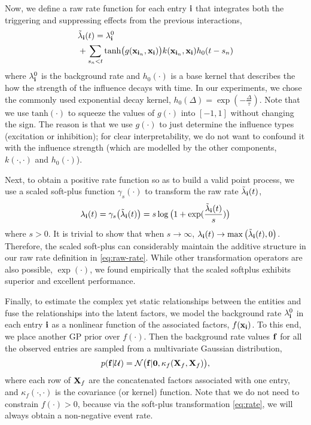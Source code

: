 Now, we define a raw rate function for each entry ${\bf i}$ that integrates both the triggering and suppressing effects from the previous interactions, 
\begin{align}
&{\tilde{\lambda}}_{{\bf i}}(t) = \lambda_{\bf i}^0 \notag \\
&+\sum_{s_n<t} \mathrm{tanh}\big(g({\bf x}_{{\bf i}_n} ,{\bf x}_{\bf i})\big)k({\bf x}_{{\bf i}_n} , {\bf x}_{{\bf i}})h_0(t-s_n)   \label{eq:raw-rate}
\end{align}
where $\lambda_{\bf i}^0$ is the background rate and $h_0(\cdot)$ is a base kernel that describes the how the strength of the influence decays with time. In our experiments, we chose the commonly used exponential decay kernel, $h_0(\Delta)=\exp(-\frac{\Delta}{\tau})$. Note that we use $\mathrm{tanh}(\cdot)$ to squeeze the values of $g(\cdot)$ into $[-1, 1]$ without changing the sign. The reason is that we use $g(\cdot)$ to just determine the influence types (excitation or inhibition); for clear interpretability, we do not want to confound it with the influence strength (which are modelled by the other components, \ie $k(\cdot, \cdot)$ and $h_0(\cdot)$). 

Next, to obtain a positive rate function so as to build a valid point process, we use a scaled soft-plus function $\gamma_s(\cdot)$ to transform the raw rate ${\tilde{\lambda}}_{{\bf i}}(t)$, 
\begin{align}
\lambda_{{\bf i}}(t) =\gamma_s\big({\tilde{\lambda}}_{{\bf i}}(t)\big) = s \log\big(1 + \exp(\frac{{\tilde{\lambda}}_{{\bf i}}(t)}{s})\big) \label{eq:rate}
\end{align}
where $s>0$. It is trivial to show that when $s \rightarrow \infty$,  $\lambda_{\bf i}(t)  \rightarrow \max\big({\tilde{\lambda}}_{\bf i}(t), 0\big)$. Therefore, the scaled soft-plus can considerably maintain the additive structure in our raw rate definition in \eqref{eq:raw-rate}. While other transformation operators are also possible, \eg $\exp(\cdot)$, we found empirically that the scaled softplus exhibits superior and excellent performance.

Finally, to estimate the complex yet static relationships between the entities and fuse the relationships into the latent factors, we model the background rate $\lambda_{\bf i}^0$ in each entry ${\bf i}$ as a nonlinear function of the associated factors, $f({\bf x}_{{\bf i}})$. To this end, we place another GP prior over $f(\cdot)$. Then the background rate values ${\bf f}$ for all the observed entries are sampled from a multivariate Gaussian distribution,
\begin{align}
p({\bf f}|{\mathcal{U}}) = \mathcal{N}\big({\bf f}|{\bf 0}, \kappa_f({\bf X}_f, {\bf X}_f)\big), \label{eq:gp-f}
\end{align} 
where each row of ${\bf X}_f$ are the concatenated factors associated with one entry, and $\kappa_f(\cdot,\cdot)$ is the covariance (or kernel) function. Note that we do not need to constrain $f(\cdot)>0$, because via the soft-plus transformation \eqref{eq:rate}, we will always obtain a non-negative event rate. 

